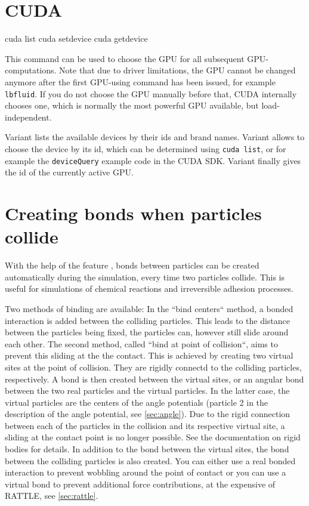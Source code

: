 \section{CUDA}
\label{sec:cuda}
\begin{essyntax}
   cuda list
   cuda setdevice 
   cuda getdevice
\end{essyntax}

This command can be used to choose the GPU for all subsequent
GPU-computations. Note that due to driver limitations, the GPU cannot
be changed anymore after the first GPU-using command has been issued,
for example \texttt{lbfluid}. If you do not choose the GPU manually
before that, CUDA internally chooses one, which is normally the most
powerful GPU available, but load-independent.

Variant  lists the available devices by their ids and brand
names. Variant  allows to choose the device by its id,
which can be determined using \texttt{cuda list}, or for example the
\texttt{deviceQuery} example code in the CUDA SDK. Variant 
finally gives the id of the currently active GPU.


\section{Creating bonds when particles collide}

With the help of the feature , bonds between
particles can be created automatically during the simulation, every time
two particles collide. This is useful for simulations of chemical reactions
and irreversible adhesion processes.

Two methods of binding are available:
In the ``bind centers`` method, a bonded interaction is added between the
colliding particles. This leads to the distance between the particles being
fixed, the particles can, however still slide around each other. The second
method, called ``bind at point of collision``, aims to prevent this sliding
at the the contact. This is achieved by creating two virtual sites at the
point of collision. They are rigidly connectd to the colliding particles,
respectively. A bond is then created between the virtual sites, or an angular
bond between the two real particles and the virtual particles. In the latter
case, the virtual particles are the centers of the angle potentials (particle
2 in the description of the angle potential, see \ref{sec:angle}). Due to the
rigid connection between each of the particles in the collision and its
respective virtual site, a sliding at the contact point is no longer possible.
See the documentation on rigid bodies for details. In addition to the bond
between the virtual sites, the bond between the colliding particles is also
created. You can either use a real bonded interaction to prevent wobbling
around the point of contact or you can use a virtual bond to prevent
additional force contributions, at the expensive of RATTLE, see \ref{sec:rattle}.

